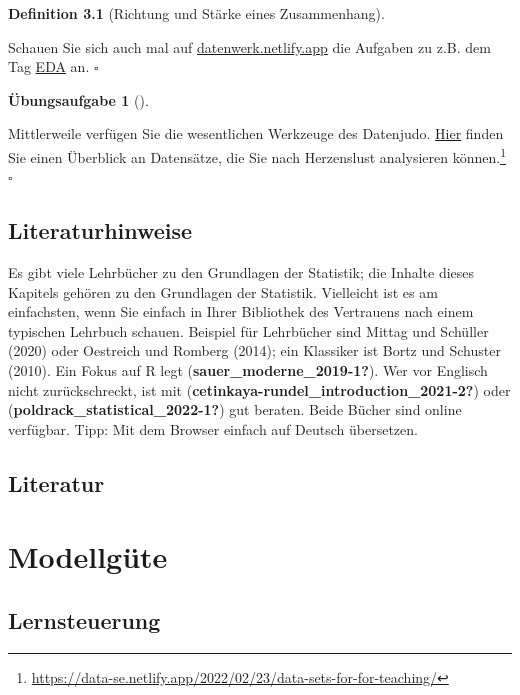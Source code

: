 \documentclass[
  a4paper,
  DIV=11]{scrreprt}
\theoremstyle{definition}
\newtheorem{exercise}{Übungsaufgabe}[chapter]
\theoremstyle{definition}
\theoremstyle{definition}
\newtheorem{definition}{Definition}[chapter]
\theoremstyle{remark}
\begin{document}
\begin{definition}[Richtung und Stärke eines
Zusammenhang]
\begin{tcolorbox}
Schauen Sie sich auch mal auf
\href{https://datenwerk.netlify.app}{datenwerk.netlify.app} die Aufgaben
zu z.B. dem Tag \href{https://datenwerk.netlify.app/\#category=eda}{EDA}
an. \(\square\)

\end{tcolorbox}

\begin{exercise}[]\protect\hypertarget{exr-datensaetze}{}\label{exr-datensaetze}

Mittlerweile verfügen Sie die wesentlichen Werkzeuge des Datenjudo.
\href{https://data-se.netlify.app/2022/02/23/data-sets-for-for-teaching/}{Hier}
finden Sie einen Überblick an Datensätze, die Sie nach Herzenslust
analysieren können.\footnote{\url{https://data-se.netlify.app/2022/02/23/data-sets-for-for-teaching/}}
\(\square\)

\end{exercise}

\section{Literaturhinweise}\label{literaturhinweise-4}

Es gibt viele Lehrbücher zu den Grundlagen der Statistik; die Inhalte
dieses Kapitels gehören zu den Grundlagen der Statistik. Vielleicht ist
es am einfachsten, wenn Sie einfach in Ihrer Bibliothek des Vertrauens
nach einem typischen Lehrbuch schauen. Beispiel für Lehrbücher sind
Mittag und Schüller (2020) oder Oestreich und Romberg (2014); ein
Klassiker ist Bortz und Schuster (2010). Ein Fokus auf R legt
(\textbf{sauer\_moderne\_2019-1?}). Wer vor Englisch nicht
zurückschreckt, ist mit
(\textbf{cetinkaya-rundel\_introduction\_2021-2?}) oder
(\textbf{poldrack\_statistical\_2022-1?}) gut beraten. Beide Bücher sind
online verfügbar. Tipp: Mit dem Browser einfach auf Deutsch übersetzen.

\section{Literatur}\label{literatur-4}

\chapter{Modellgüte}\label{modellguxfcte}

\section{Lernsteuerung}\label{lernsteuerung-5}


\end{definition}
\end{document}
